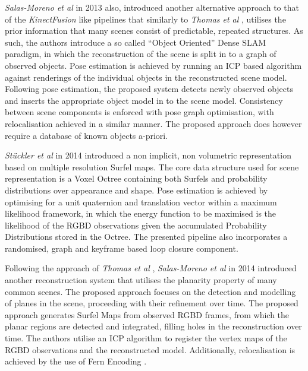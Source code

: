 \textit{Salas-Moreno et al} \cite{Salas-Moreno2013} in 2013 also, introduced another alternative 
approach to that of the \textit{KinectFusion} \cite{Newcombe2011} like pipelines that similarly to 
\textit{Thomas et al} \cite{Thomas2013}, utilises the prior information that many scenes consist 
of predictable, repeated structures. As such, the authors introduce a so called ``Object Oriented'' 
Dense SLAM paradigm, in which the reconstruction of the scene is split in to a graph of observed 
objects. Pose estimation is achieved by running an ICP based algorithm against renderings of the 
individual objects in the reconstructed scene model. Following pose estimation, the proposed 
system detects newly observed objects and inserts the appropriate object model in to the scene 
model. Consistency between scene components is enforced with pose graph optimisation, with 
relocalisation achieved in a similar manner. The proposed approach does however require a 
database of known objects a-priori.

\textit{St{\"u}ckler et al} \cite{Stuckler2014} in 2014 introduced a non implicit, non volumetric 
representation based on multiple resolution Surfel \cite{Pfister2000} maps. The core data structure 
used for scene representation is a Voxel Octree \cite{OCTREE} containing both Surfels and 
probability distributions over appearance and shape. Pose estimation is achieved by optimising for 
a unit quaternion \cite{QUAT} and translation vector within a maximum likelihood framework, in which 
the energy function to be maximised is the likelihood of the RGBD observations given the accumulated 
Probability Distributions stored in the Octree. The presented pipeline also incorporates a randomised, 
graph and keyframe based loop closure component.

Following the approach of \textit{Thomas et al} \cite{Thomas2013}, \textit{Salas-Moreno et al} 
\cite{Salas-Moreno2014} in 2014 introduced another reconstruction system that utilises the
planarity property of many common scenes. The proposed approach focuses on the detection and 
modelling of planes in the scene, proceeding with their refinement over time. 
The proposed approach generates Surfel \cite{Pfister2000} Maps from observed RGBD frames, from 
which the planar regions are detected and integrated, filling holes in the reconstruction over time.
The authors utilise an ICP algorithm to register the vertex maps of the RGBD observations and the 
reconstructed model. Additionally, relocalisation is achieved by the use of Fern Encoding \cite{FERN}. 

